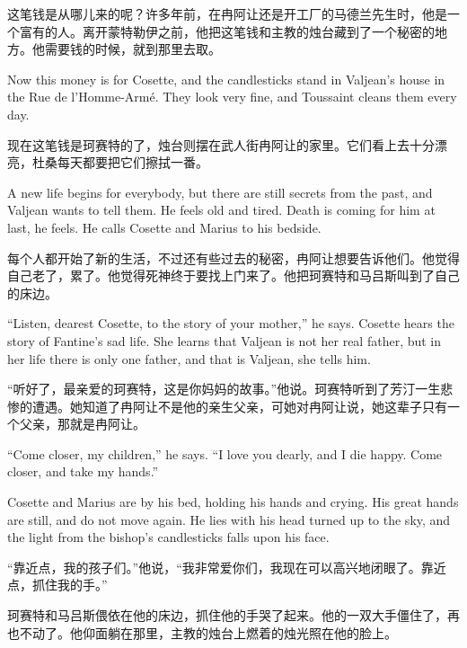 \documentclass[fontset=ubuntu, zihao=5]{ctexart}
\begin{document}
\begin{paracol}{2}
\switchcolumn

这笔钱是从哪儿来的呢？许多年前，在冉阿让还是开工厂的马德兰先生时，他是一个富有的人。离开蒙特勒伊之前，他把这笔钱和主教的烛台藏到了一个秘密的地方。他需要钱的时候，就到那里去取。

\switchcolumn*

Now this money is for Cosette, and the candlesticks stand in Valjean's house in the Rue de l'Homme-Armé. They look very fine, and Toussaint cleans them every day.


\switchcolumn

现在这笔钱是珂赛特的了，烛台则摆在武人街冉阿让的家里。它们看上去十分漂亮，杜桑每天都要把它们擦拭一番。

\switchcolumn*

A new life begins for everybody, but there are still secrets from the past, and Valjean wants to tell them. He feels old and tired. Death is coming for him at last, he feels. He calls Cosette and Marius to his bedside.

\switchcolumn

每个人都开始了新的生活，不过还有些过去的秘密，冉阿让想要告诉他们。他觉得自己老了，累了。他觉得死神终于要找上门来了。他把珂赛特和马吕斯叫到了自己的床边。

\switchcolumn*

``Listen, dearest Cosette, to the story of your mother,'' he says. Cosette hears the story of Fantine's sad life. She learns that Valjean is not her real father, but in her life there is only one father, and that is Valjean, she tells him.

\switchcolumn

“听好了，最亲爱的珂赛特，这是你妈妈的故事。”他说。珂赛特听到了芳汀一生悲惨的遭遇。她知道了冉阿让不是他的亲生父亲，可她对冉阿让说，她这辈子只有一个父亲，那就是冉阿让。

\switchcolumn*

``Come closer, my children,'' he says. ``I love you dearly, and I die happy. Come closer, and take my hands.''

Cosette and Marius are by his bed, holding his hands and crying. His great hands are still, and do not move again. He lies with his head turned up to the sky, and the light from the bishop's candlesticks falls upon his face.

\switchcolumn

“靠近点，我的孩子们。”他说，“我非常爱你们，我现在可以高兴地闭眼了。靠近点，抓住我的手。”

珂赛特和马吕斯偎依在他的床边，抓住他的手哭了起来。他的一双大手僵住了，再也不动了。他仰面躺在那里，主教的烛台上燃着的烛光照在他的脸上。

\end{paracol}
\clearpage

 \newlength{\originalVOffset}
 \newlength{\originalHOffset}
 \setlength{\originalVOffset}{\voffset}
 \setlength{\originalHOffset}{\hoffset}

 \setlength{\voffset}{0cm}
 \setlength{\hoffset}{0cm}
 
 \setlength{\voffset}{\originalVOffset}
 \setlength{\hoffset}{\originalHOffset}
\end{document}
